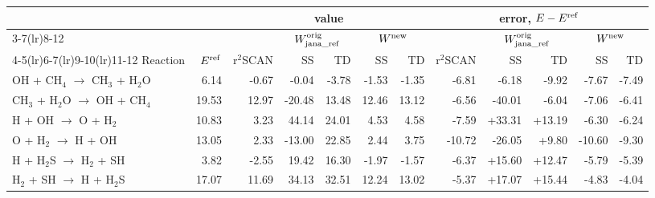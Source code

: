 \begin{tabular}{@{}l r rrrrr rrrrr@{}}
\toprule
 & & \multicolumn{5}{c}{value} & \multicolumn{5}{c}{error, $E-E^{\rm ref}$} \\
\cmidrule(lr){3-7}\cmidrule(lr){8-12}
 & & & \multicolumn{2}{c}{$W^{\rm orig}_{\rm jana\_ref}$} & \multicolumn{2}{c}{$W^{\rm new}$} & & \multicolumn{2}{c}{$W^{\rm orig}_{\rm jana\_ref}$} & \multicolumn{2}{c}{$W^{\rm new}$} \\
\cmidrule(lr){4-5}\cmidrule(lr){6-7}\cmidrule(lr){9-10}\cmidrule(lr){11-12}
Reaction & $E^{\rm ref}$ & r$^2$SCAN & SS & TD & SS & TD & r$^2$SCAN & SS & TD & SS & TD \\
\midrule
OH + CH$_4$ $\to$ CH$_3$ + H$_2$O & 6.14 & \textcolor{pyscfred}{-0.67} & \textcolor{pyscfred}{-0.04} & \textcolor{pyscfred}{-3.78} & \textcolor{pyscfred}{-1.53} & \textcolor{pyscfred}{-1.35} & \textcolor{pyscfred}{-6.81} & \textcolor{pyscfred}{-6.18} & \textcolor{pyscfred}{-9.92} & \textcolor{pyscfred}{-7.67} & \textcolor{pyscfred}{-7.49} \\
CH$_3$ + H$_2$O $\to$ OH + CH$_4$ & 19.53 & \textcolor{pyscfred}{12.97} & \textcolor{pyscfred}{-20.48} & \textcolor{pyscfred}{13.48} & \textcolor{pyscfred}{12.46} & \textcolor{pyscfred}{13.12} & \textcolor{pyscfred}{-6.56} & \textcolor{pyscfred}{-40.01} & \textcolor{pyscfred}{-6.04} & \textcolor{pyscfred}{-7.06} & \textcolor{pyscfred}{-6.41} \\
H + OH $\to$ O + H$_2$ & 10.83 & \textcolor{pyscfred}{3.23} & \textcolor{pyscfred}{44.14} & \textcolor{pyscfred}{24.01} & \textcolor{pyscfred}{4.53} & \textcolor{pyscfred}{4.58} & \textcolor{pyscfred}{-7.59} & \textcolor{pyscfred}{+33.31} & \textcolor{pyscfred}{+13.19} & \textcolor{pyscfred}{-6.30} & \textcolor{pyscfred}{-6.24} \\
O + H$_2$ $\to$ H + OH & 13.05 & \textcolor{pyscfred}{2.33} & \textcolor{pyscfred}{-13.00} & \textcolor{pyscfred}{22.85} & \textcolor{pyscfred}{2.44} & \textcolor{pyscfred}{3.75} & \textcolor{pyscfred}{-10.72} & \textcolor{pyscfred}{-26.05} & \textcolor{pyscfred}{+9.80} & \textcolor{pyscfred}{-10.60} & \textcolor{pyscfred}{-9.30} \\
H + H$_2$S $\to$ H$_2$ + SH & 3.82 & \textcolor{pyscfred}{-2.55} & \textcolor{pyscfred}{19.42} & \textcolor{pyscfred}{16.30} & \textcolor{pyscfred}{-1.97} & \textcolor{pyscfred}{-1.57} & \textcolor{pyscfred}{-6.37} & \textcolor{pyscfred}{+15.60} & \textcolor{pyscfred}{+12.47} & \textcolor{pyscfred}{-5.79} & \textcolor{pyscfred}{-5.39} \\
H$_2$ + SH $\to$ H + H$_2$S & 17.07 & \textcolor{pyscfred}{11.69} & \textcolor{pyscfred}{34.13} & \textcolor{pyscfred}{32.51} & \textcolor{pyscfred}{12.24} & \textcolor{pyscfred}{13.02} & \textcolor{pyscfred}{-5.37} & \textcolor{pyscfred}{+17.07} & \textcolor{pyscfred}{+15.44} & \textcolor{pyscfred}{-4.83} & \textcolor{pyscfred}{-4.04} \\

\end{tabular}
